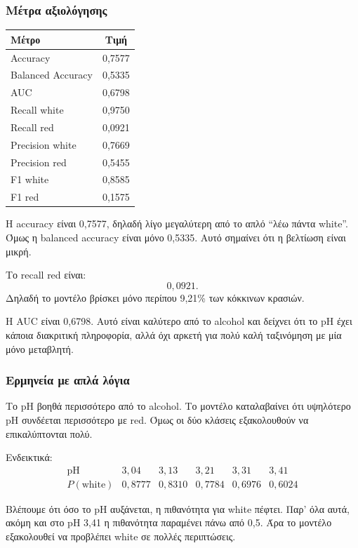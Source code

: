 \documentclass[11pt,a4paper]{article}
\begin{document}
\subsubsection{Μέτρα αξιολόγησης}

\begin{center}
\begin{tabular}{lc}
\toprule
Μέτρο & Τιμή \\
\midrule
Accuracy & 0,7577 \\
Balanced Accuracy & 0,5335 \\
AUC & 0,6798 \\
Recall white & 0,9750 \\
Recall red & 0,0921 \\
Precision white & 0,7669 \\
Precision red & 0,5455 \\
F1 white & 0,8585 \\
F1 red & 0,1575 \\
\bottomrule
\end{tabular}
\end{center}

Η accuracy είναι 0,7577, δηλαδή λίγο μεγαλύτερη από το απλό ``λέω πάντα
white''. Όμως η balanced accuracy είναι μόνο 0,5335. Αυτό σημαίνει ότι η
βελτίωση είναι μικρή.

Το recall red είναι:
\[
0{,}0921.
\]
Δηλαδή το μοντέλο βρίσκει μόνο περίπου 9,21\% των κόκκινων κρασιών.

Η AUC είναι 0,6798. Αυτό είναι καλύτερο από το alcohol και δείχνει ότι το pH
έχει κάποια διακριτική πληροφορία, αλλά όχι αρκετή για πολύ καλή ταξινόμηση
με μία μόνο μεταβλητή.

\subsubsection{Ερμηνεία με απλά λόγια}

Το pH βοηθά περισσότερο από το alcohol. Το μοντέλο καταλαβαίνει ότι υψηλότερο
pH συνδέεται περισσότερο με red. Όμως οι δύο κλάσεις εξακολουθούν να
επικαλύπτονται πολύ.

Ενδεικτικά:
\[
\begin{array}{c|ccccc}
\text{pH} & 3{,}04 & 3{,}13 & 3{,}21 & 3{,}31 & 3{,}41 \\
\hline
P(\text{white}) & 0{,}8777 & 0{,}8310 & 0{,}7784 & 0{,}6976 & 0{,}6024
\end{array}
\]

Βλέπουμε ότι όσο το pH αυξάνεται, η πιθανότητα για white πέφτει. Παρ' όλα
αυτά, ακόμη και στο pH 3,41 η πιθανότητα παραμένει πάνω από 0,5. Άρα το
μοντέλο εξακολουθεί να προβλέπει white σε πολλές περιπτώσεις.
\end{document}
